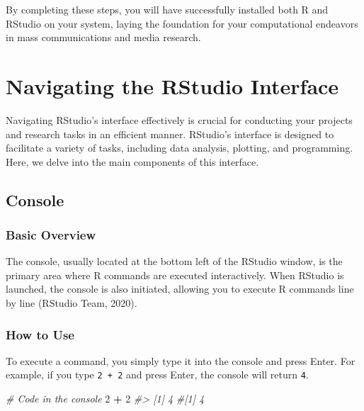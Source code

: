 \documentclass[
]{book}
\newenvironment{Shaded}{\begin{snugshade}}{\end{snugshade}}
\newcommand{\CommentTok}[1]{\textcolor[rgb]{0.56,0.35,0.01}{\textit{#1}}}
\newcommand{\DecValTok}[1]{\textcolor[rgb]{0.00,0.00,0.81}{#1}}
\newcommand{\SpecialCharTok}[1]{\textcolor[rgb]{0.81,0.36,0.00}{\textbf{#1}}}
\begin{document}
By completing these steps, you will have successfully installed both R and RStudio on your system, laying the foundation for your computational endeavors in mass communications and media research.

\hypertarget{navigating-the-rstudio-interface}{%
\section{Navigating the RStudio Interface}\label{navigating-the-rstudio-interface}}

Navigating RStudio's interface effectively is crucial for conducting your projects and research tasks in an efficient manner. RStudio's interface is designed to facilitate a variety of tasks, including data analysis, plotting, and programming. Here, we delve into the main components of this interface.

\hypertarget{console}{%
\subsection*{Console}\label{console}}

\hypertarget{basic-overview}{%
\subsubsection*{Basic Overview}\label{basic-overview}}

The console, usually located at the bottom left of the RStudio window, is the primary area where R commands are executed interactively. When RStudio is launched, the console is also initiated, allowing you to execute R commands line by line (RStudio Team, 2020).

\hypertarget{how-to-use}{%
\subsubsection*{How to Use}\label{how-to-use}}

To execute a command, you simply type it into the console and press Enter. For example, if you type \texttt{2\ +\ 2} and press Enter, the console will return \texttt{4}.

\begin{Shaded}
\begin{Highlighting}[]
\CommentTok{\# Code in the console}
\DecValTok{2} \SpecialCharTok{+} \DecValTok{2}
\CommentTok{\#\textgreater{} [1] 4}
\CommentTok{\#[1] 4}
\end{Highlighting}
\end{Shaded}
\end{document}
